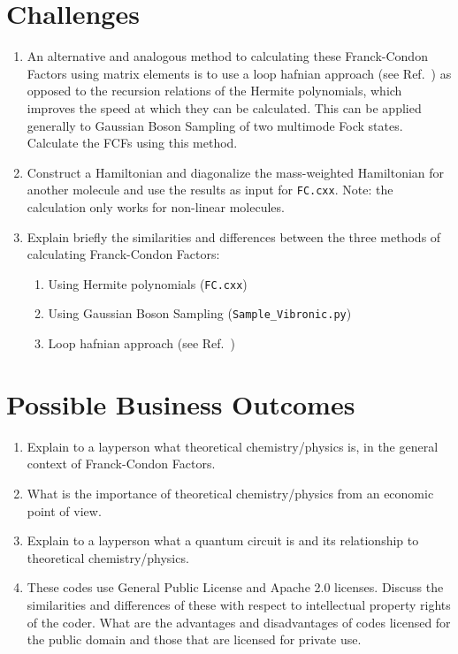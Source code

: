 \documentclass[12pt]{article}
\begin{document}
\section*{Challenges}

\begin{enumerate}
    \item An alternative and analogous method to calculating these Franck-Condon Factors using matrix elements is to use a loop hafnian approach (see Ref.~\cite{quesadaFranckCondonFactorsCounting2019}) as opposed to the recursion relations of the Hermite polynomials, which improves the speed at which they can be calculated. This can be applied generally to Gaussian Boson Sampling of two multimode Fock states. Calculate the FCFs using this method.
    \item Construct a Hamiltonian and diagonalize the mass-weighted Hamiltonian for another molecule and use the results as input for \texttt{FC.cxx}. Note: the calculation only works for non-linear molecules.
    \item Explain briefly the similarities and differences between the three methods of calculating Franck-Condon Factors:
    \begin{enumerate}
    \item Using Hermite polynomials (\texttt{FC.cxx})
    \item Using Gaussian Boson Sampling (\texttt{Sample\_Vibronic.py})
    \item Loop hafnian approach (see Ref.~\cite{quesadaFranckCondonFactorsCounting2019})
    \end{enumerate}

\end{enumerate}

\section*{Possible Business Outcomes}

\begin{enumerate}
    \item Explain to a layperson what theoretical chemistry/physics is, in the general context of Franck-Condon Factors.
    \item What is the importance of theoretical chemistry/physics from an economic point of view.
    \item Explain to a layperson what a quantum circuit is and its relationship to theoretical chemistry/physics.
    \item These codes use General Public License and Apache 2.0 licenses. Discuss the similarities and differences of these with respect to intellectual property rights of the coder. What are the advantages and disadvantages of codes licensed for the public domain and those that are licensed for private use.
\end{enumerate}

\newpage



\end{document}
